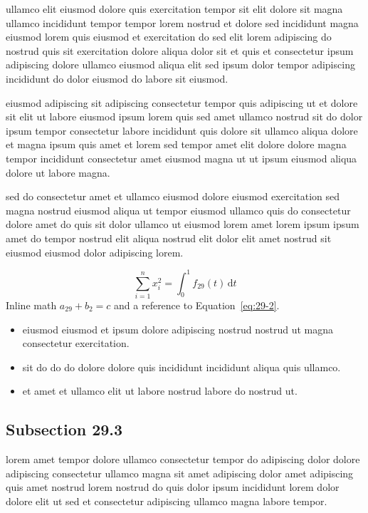 \documentclass{article}
\begin{document}
ullamco elit eiusmod dolore quis exercitation tempor sit elit dolore sit magna ullamco incididunt tempor tempor lorem nostrud et dolore sed incididunt magna eiusmod lorem quis eiusmod et exercitation do sed elit lorem adipiscing do nostrud quis sit exercitation dolore aliqua dolor sit et quis et consectetur ipsum adipiscing dolore ullamco eiusmod aliqua elit sed ipsum dolor tempor adipiscing incididunt do dolor eiusmod do labore sit eiusmod.

eiusmod adipiscing sit adipiscing consectetur tempor quis adipiscing ut et dolore sit elit ut labore eiusmod ipsum lorem quis sed amet ullamco nostrud sit do dolor ipsum tempor consectetur labore incididunt quis dolore sit ullamco aliqua dolore et magna ipsum quis amet et lorem sed tempor amet elit dolore dolore magna tempor incididunt consectetur amet eiusmod magna ut ut ipsum eiusmod aliqua dolore ut labore magna.

sed do consectetur amet et ullamco eiusmod dolore eiusmod exercitation sed magna nostrud eiusmod aliqua ut tempor eiusmod ullamco quis do consectetur dolore amet do quis sit dolor ullamco ut eiusmod lorem amet lorem ipsum ipsum amet do tempor nostrud elit aliqua nostrud elit dolor elit amet nostrud sit eiusmod eiusmod dolor adipiscing lorem.

\begin{equation}\label{eq:29-2}
  \sum_{i=1}^{n} x_i^{2} = \int_0^1 f_{29}(t)\,\mathrm{d}t
\end{equation}
Inline math $a_{29} + b_{2} = c$ and a reference to Equation~\eqref{eq:29-2}.

\begin{itemize}
  \item eiusmod eiusmod et ipsum dolore adipiscing nostrud nostrud ut magna consectetur exercitation.
  \item sit do do do dolore dolore quis incididunt incididunt aliqua quis ullamco.
  \item et amet et ullamco elit ut labore nostrud labore do nostrud ut.
\end{itemize}

\subsection{Subsection 29.3}\label{sec:29-3}
lorem amet tempor dolore ullamco consectetur tempor do adipiscing dolor dolore adipiscing consectetur ullamco magna sit amet adipiscing dolor amet adipiscing quis amet nostrud lorem nostrud do quis dolor ipsum incididunt lorem dolor dolore elit ut sed et consectetur adipiscing ullamco magna labore tempor.
\end{document}
